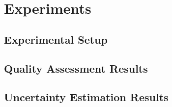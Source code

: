 
\section{Experiments}
\label{sec:experiments}

\subsection{Experimental Setup}
\label{sec:exp:setup}



\subsection{Quality Assessment Results}
\label{sec:exp:iqa}



% 

\subsection{Uncertainty Estimation Results}
\label{sec:exp:uncertainty}



